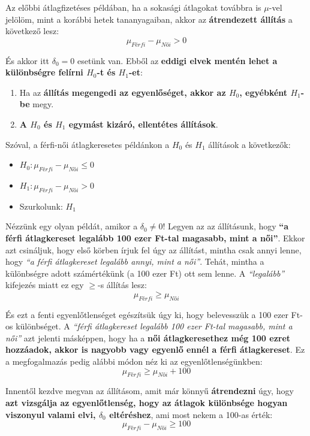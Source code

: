\documentclass[
]{book}
\providecommand{\tightlist}{%
  \setlength{\itemsep}{0pt}\setlength{\parskip}{0pt}}
\begin{document}
Az előbbi átlagfizetéses példában, ha a sokasági átlagokat továbbra is \(\mu\)-vel jelölöm, mint a korábbi hetek tananyagaiban, akkor az \textbf{átrendezett állítás} a következő lesz: \[\mu_{Férfi} - \mu_{Női} > 0\]

És akkor itt \(\delta_0=0\) esetünk van. Ebből az \textbf{eddigi elvek mentén lehet a különbségre felírni \(H_0\)-t és \(H_1\)-et}:

\begin{enumerate}
\def\labelenumi{\arabic{enumi}.}
\tightlist
\item
  Ha az \textbf{állítás megengedi az egyenlőséget, akkor az \(H_0\), egyébként \(H_1\)-be} megy.
\item
  \textbf{A \(H_0\) és \(H_1\) egymást kizáró, ellentétes állítások}.
\end{enumerate}

Szóval, a férfi-női átlagkeresetes példánkon a \(H_0\) és \(H_1\) állítások a következők:

\begin{itemize}
\tightlist
\item
  \(H_0:\mu_{Férfi} - \mu_{Női} \leq 0\)
\item
  \(H_1:\mu_{Férfi} - \mu_{Női} > 0\)
\item
  Szurkolunk: \(H_1\)
\end{itemize}

Nézzünk egy olyan példát, amikor a \(\delta_0 \neq 0\)! Legyen az az állításunk, hogy \textbf{``a férfi átlagkereset legalább 100 ezer Ft-tal magasabb, mint a női''}. Ekkor azt csináljuk, hogy első körben írjuk fel úgy az állítást, mintha csak annyi lenne, hogy \emph{``a férfi átlagkereset legalább annyi, mint a női''}. Tehát, mintha a különbségre adott számértékünk (a 100 ezer Ft) ott sem lenne. A \emph{``legalább''} kifejezés miatt ez egy \(\geq\)-s állítás lesz: \[\mu_{Férfi} \geq  \mu_{Női}\]

És ezt a fenti egyenlőtlenséget egészítsük úgy ki, hogy belevesszük a 100 ezer Ft-os különbséget. A \emph{``férfi átlagkereset legalább 100 ezer Ft-tal magasabb, mint a női''} azt jelenti másképpen, hogy ha a \textbf{női átlagkeresethez még 100 ezret hozzáadok, akkor is nagyobb vagy egyenlő ennél a férfi átlagkereset}. Ez a megfogalmazás pedig alábbi módon néz ki az egyenlőtlenségünkben: \[\mu_{Férfi} \geq  \mu_{Női} + 100\]

Innentől kezdve megvan az állításom, amit már könnyű \textbf{átrendezni} úgy, hogy \textbf{azt vizsgálja az egyenlőtlenség, hogy az átlagok különbsége hogyan viszonyul valami elvi, \(\delta_0\) eltéréshez}, ami most nekem a 100-as érték: \[\mu_{Férfi} -  \mu_{Női} \geq 100\]
\end{document}
